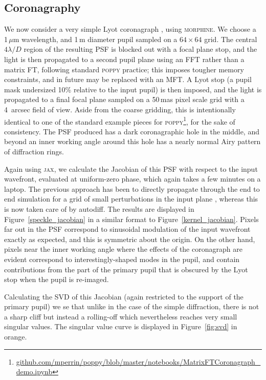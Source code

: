 \documentclass[modern]{aastex63}
\begin{document}
\subsection{Coronagraphy}
\label{sec:coronagraph}

We now consider a very simple Lyot coronagraph \citep{lyot30}, using \textsc{morphine}. We choose a 1\,$\mu$m wavelength, and 1\,m diameter pupil sampled on a $64\times64$ grid. The central $4 \lambda/D$ region of the resulting PSF is blocked out with a focal plane stop, and the light is then propagated to a second pupil plane using an FFT rather than a matrix FT, following standard \textsc{poppy} practice; this imposes tougher memory constraints, and in future may be replaced with an MFT. A Lyot stop (a pupil mask undersized 10\% relative to the input pupil) is then imposed, and the light is propagated to a final focal plane sampled on a 50\,mas pixel scale grid with a 4~arcsec field of view. Aside from the coarse gridding, this is intentionally identical to one of the standard example pieces for \textsc{poppy}\footnote{\href{https://github.com/mperrin/poppy/blob/master/notebooks/MatrixFTCoronagraph_demo.ipynb}{github.com/mperrin/poppy/blob/master/notebooks/MatrixFTCoronagraph\_demo.ipynb}}, for the sake of consistency. The PSF produced has a dark coronagraphic hole in the middle, and beyond an inner working angle around this hole has a nearly normal Airy pattern of diffraction rings.

Again using \textsc{jax}, we calculate the Jacobian of this PSF with respect to the input wavefront, evaluated at uniform-zero phase, which again takes a few minutes on a laptop. The previous approach has been to directly propagate through the end to end simulation for a grid of small perturbations in the input plane \citep{falco}, whereas this is now taken care of by autodiff. The results are displayed in Figure~\ref{speckle_jacobian} in a similar format to Figure~\ref{kernel_jacobian}. Pixels far out in the PSF correspond to sinusoidal modulation of the input wavefront exactly as expected, and this is symmetric about the origin. On the other hand, pixels near the inner working angle where the effects of the coronagraph are evident correspond to interestingly-shaped modes in the pupil, and contain contributions from the part of the primary pupil that is obscured by the Lyot stop when the pupil is re-imaged. 

Calculating the SVD of this Jacobian (again restricted to the support of the primary pupil) we se that unlike in the case of the simple diffraction, there is not a sharp cliff but instead a rolling-off which nevertheless reaches very small singular values. The singular value curve is displayed in Figure~\ref{fig:svd} in orange. 
\end{document}

